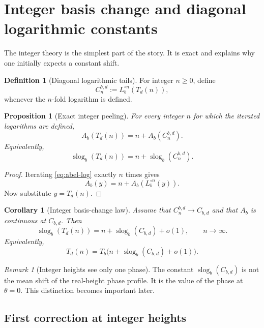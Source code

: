 \documentclass[11pt,a4paper]{article}
\theoremstyle{plain}
\newtheorem{proposition}[theorem]{Proposition}
\newtheorem{corollary}[theorem]{Corollary}
\theoremstyle{definition}
\newtheorem{definition}[theorem]{Definition}
\theoremstyle{remark}
\newtheorem{remark}[theorem]{Remark}
\newcommand{\slog}{\operatorname{slog}}
\begin{document}
\section{Integer basis change and diagonal logarithmic constants}

The integer theory is the simplest part of the story.  It is exact and explains why one initially expects a constant shift.

\begin{definition}[Diagonal logarithmic tails]
For integer $n\geq0$, define
\begin{equation}\label{eq:Cn-def}
  C_n^{b,d}:=L_b^{\circ n}(T_d(n)),
\end{equation}
whenever the $n$-fold logarithm is defined.
\end{definition}

\begin{proposition}[Exact integer peeling]\label{prop:integer-peeling}
For every integer $n$ for which the iterated logarithms are defined,
\begin{equation}\label{eq:integer-peeling}
  A_b(T_d(n))=n+A_b(C_n^{b,d}).
\end{equation}
Equivalently,
\[
  \slog_b(T_d(n))=n+\slog_b(C_n^{b,d}).
\]
\end{proposition}

\begin{proof}
Iterating \eqref{eq:abel-log} exactly $n$ times gives
\[
  A_b(y)=n+A_b(L_b^{\circ n}(y)).
\]
Now substitute $y=T_d(n)$.
\end{proof}

\begin{corollary}[Integer basis-change law]\label{cor:integer-law}
Assume that $C_n^{b,d}\to C_{b,d}$ and that $A_b$ is continuous at $C_{b,d}$.  Then
\begin{equation}\label{eq:integer-law}
  \slog_b(T_d(n))=n+\slog_b(C_{b,d})+o(1),\qquad n\to\infty.
\end{equation}
Equivalently,
\[
  T_d(n)=T_b\bigl(n+\slog_b(C_{b,d})+o(1)\bigr).
\]
\end{corollary}

\begin{remark}[Integer heights see only one phase]
The constant $\slog_b(C_{b,d})$ is not the mean shift of the real-height phase profile.  It is the value of the phase at $\theta=0$.  This distinction becomes important later.
\end{remark}

\subsection{First correction at integer heights}
\end{document}

